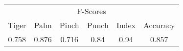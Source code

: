 \documentclass{standalone}
\begin{document}
 
 \begin{tabular}{|c|c|c|c|c ||c|}
\cline{1-6}\multicolumn{6}{|c|}{F-Scores} \\ 
\cline{1-6}Tiger & Palm & Pinch & Punch & Index & Accuracy\\ 
\cline{1-6}0.758 & 0.876 & 0.716 & 0.84 & 0.94 & 0.857\\ 
 \cline{1-6}\hline \end{tabular}
 
\end{document}
